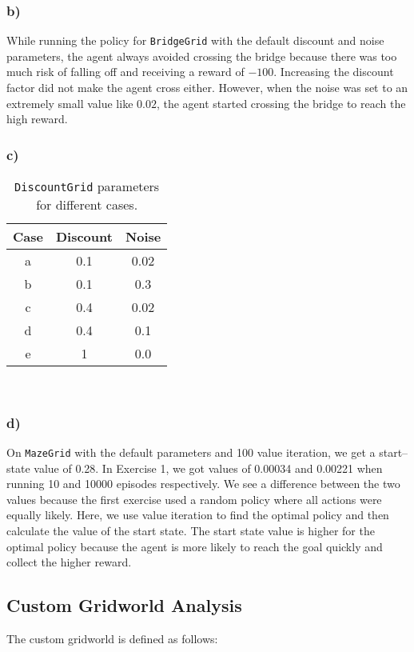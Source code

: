 \documentclass[11pt]{article}
\begin{document}
\subsubsection*{b)} While running the policy for \texttt{BridgeGrid} with the default discount and noise parameters, the agent always avoided crossing the bridge because there was too much risk of falling off and receiving a reward of $-100$. Increasing the discount factor did not make the agent cross either. However, when the noise was set to an extremely small value like  $0.02$, the agent started crossing the bridge to reach the high reward. 

\subsubsection*{c)}

\begin{table}[H]
\centering
\begin{tabular}{|c|c|c|}
\hline
\textbf{Case} & \textbf{Discount} & \textbf{Noise} \\ \hline
a & 0.1 & 0.02 \\ \hline
b & 0.1 & 0.3 \\ \hline
c & 0.4 & 0.02 \\ \hline
d & 0.4 & 0.1 \\ \hline
e & 1 & 0.0 \\ \hline

\end{tabular}
\caption{\texttt{DiscountGrid} parameters for different cases.}
\end{table}

\

\subsubsection*{d)} On \texttt{MazeGrid} with the default parameters and 100 value iteration, we get a start--state value of 0.28. In Exercise 1, we got values of 0.00034 and 0.00221 when running 10 and 10000 episodes respectively. We see a difference between the two values because the first exercise used a random policy where all actions were equally likely. Here, we use value iteration to find the optimal policy and then calculate the value of the start state. The start state value is higher for the optimal policy because the agent is more likely to reach the goal quickly and collect the higher reward.

\subsection{Custom Gridworld Analysis}
The custom gridworld is defined as follows:
\end{document}
